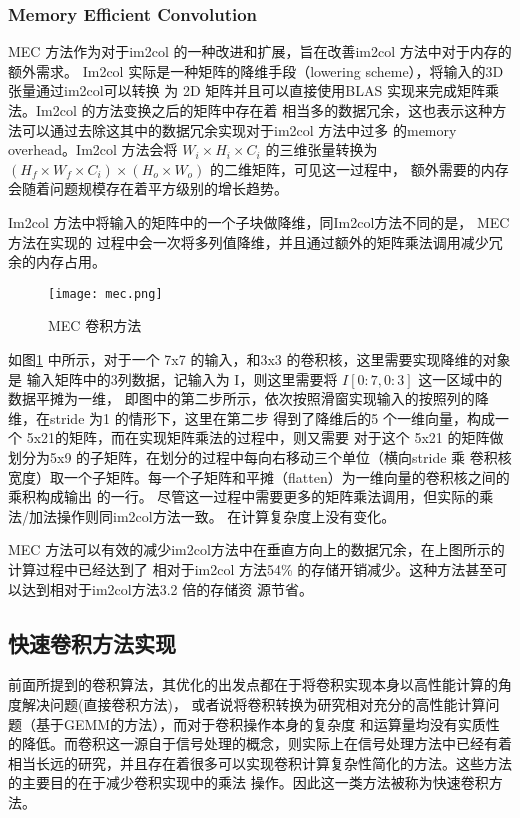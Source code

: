 \subsubsection{Memory Efficient Convolution}

MEC 方法\cite{Cho2017MECMC}作为对于im2col 的一种改进和扩展，旨在改善im2col 方法中对于内存的额外需求。
Im2col 实际是一种矩阵的降维手段（lowering scheme），将输入的3D 张量通过im2col可以转换
为 2D 矩阵并且可以直接使用BLAS 实现来完成矩阵乘法。Im2col 的方法变换之后的矩阵中存在着
相当多的数据冗余，这也表示这种方法可以通过去除这其中的数据冗余实现对于im2col 方法中过多
的memory overhead。Im2col 方法会将 $ W_i \times H_i \times C_i $ 的三维张量转换为 
$(H_f \times W_f \times C_i) \times (H_o \times W_o) $ 的二维矩阵，可见这一过程中，
额外需要的内存会随着问题规模存在着平方级别的增长趋势。

Im2col 方法中将输入的矩阵中的一个子块做降维，同Im2col方法不同的是， MEC 方法在实现的
过程中会一次将多列值降维，并且通过额外的矩阵乘法调用减少冗余的内存占用。

\begin{figure}
  \centering
  \texttt{[image: mec.png]}
  \caption{MEC 卷积方法}
  \label{fig:mec}
\end{figure}

如图\ref{fig:mec} 中所示，对于一个 7x7 的输入，和3x3 的卷积核，这里需要实现降维的对象是
输入矩阵中的3列数据，记输入为 I，则这里需要将 $ I[0:7, 0:3] $ 这一区域中的数据平摊为一维，
即图中的第二步所示，依次按照滑窗实现输入的按照列的降维，在stride 为1 的情形下，这里在第二步
得到了降维后的5 个一维向量，构成一个 5x21的矩阵，而在实现矩阵乘法的过程中，则又需要
对于这个 5x21 的矩阵做划分为5x9 的子矩阵，在划分的过程中每向右移动三个单位（横向stride 乘
卷积核宽度）取一个子矩阵。每一个子矩阵和平摊（flatten）为一维向量的卷积核之间的乘积构成输出
的一行。 尽管这一过程中需要更多的矩阵乘法调用，但实际的乘法/加法操作则同im2col方法一致。
在计算复杂度上没有变化。


MEC 方法可以有效的减少im2col方法中在垂直方向上的数据冗余，在上图所示的计算过程中已经达到了
相对于im2col 方法54\% 的存储开销减少。这种方法甚至可以达到相对于im2col方法3.2 倍的存储资
源节省。

\subsection{快速卷积方法实现}

前面所提到的卷积算法，其优化的出发点都在于将卷积实现本身以高性能计算的角度解决问题(直接卷积方法)，
或者说将卷积转换为研究相对充分的高性能计算问题（基于GEMM的方法），而对于卷积操作本身的复杂度
和运算量均没有实质性的降低。而卷积这一源自于信号处理的概念，则实际上在信号处理方法中已经有着
相当长远的研究，并且存在着很多可以实现卷积计算复杂性简化的方法。这些方法的主要目的在于减少卷积实现中的乘法
操作。因此这一类方法被称为快速卷积方法。

